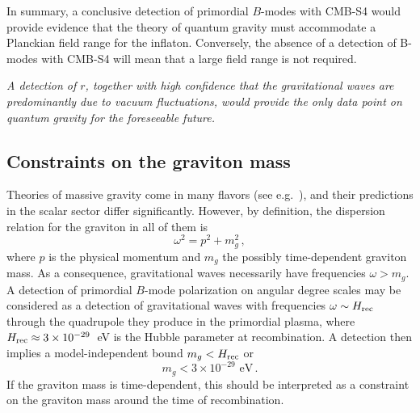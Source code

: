 In summary, a conclusive detection of primordial $B$-modes with CMB-S4 would provide evidence that the theory of quantum gravity must accommodate a Planckian field range for the inflaton. Conversely, the absence of a detection of B-modes with CMB-S4 will mean that a large field range is not required. 

{\it A detection of $r$, together with high confidence that the gravitational waves are predominantly due to vacuum fluctuations, would provide the only data point on quantum gravity for the foreseeable future.}

\subsection{Constraints on the graviton mass}

Theories of massive gravity come in many flavors (see e.g.~\cite{Dubovsky:2004sg,Hinterbichler:2011tt}), and their predictions in the scalar sector differ significantly. However, by definition, the dispersion relation for the graviton in all of them is
\begin{equation}
\omega^2=p^2+m_g^2\,,
\end{equation}
where $p$ is the physical momentum and $m_g$ the possibly time-dependent graviton mass. As a consequence, gravitational waves necessarily have frequencies $\omega>m_g$. A detection of primordial $B$-mode polarization on angular degree scales may be considered as a detection of gravitational waves with frequencies $\omega\sim H_{\rm rec}$ through the quadrupole they produce in the primordial plasma, where $H_{\rm rec}\approx 3\times 10^{-29}$~eV is the Hubble parameter at recombination. A detection then implies a model-independent bound $m_g<H_{\rm rec}$ or 
\begin{equation}
m_g< 3\times 10^{-29}{\mbox{ eV}}\,.
\end{equation}
If the graviton mass is time-dependent, this should be interpreted as a constraint on the graviton mass around the time of recombination.

